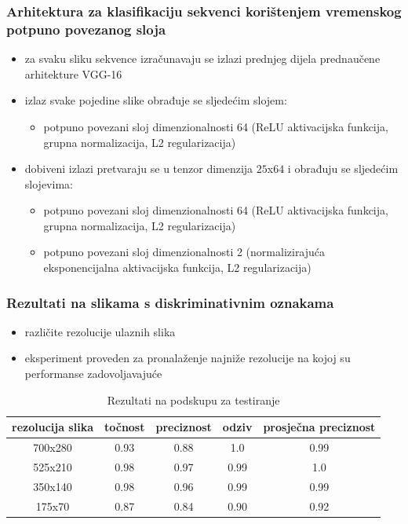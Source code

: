 \documentclass{beamer}
\begin{document}
\begin{frame}
\frametitle{Arhitektura za klasifikaciju sekvenci korištenjem vremenskog potpuno povezanog sloja}
 \begin{itemize}
  \item za svaku sliku sekvence izračunavaju se izlazi prednjeg dijela prednaučene arhitekture VGG-16
  \item izlaz svake pojedine slike obrađuje se sljedećim slojem:
  \begin{itemize}
   \item potpuno povezani sloj dimenzionalnosti 64 (ReLU aktivacijska funkcija, grupna normalizacija, L2 regularizacija)
  \end{itemize}
  \item dobiveni izlazi pretvaraju se u tenzor dimenzija $25$x$64$ i obrađuju se sljedećim slojevima:
  \begin{itemize}
  \item potpuno povezani sloj dimenzionalnosti 64 (ReLU aktivacijska funkcija, grupna normalizacija, L2 regularizacija)
  \item potpuno povezani sloj dimenzionalnosti 2 (normalizirajuća eksponencijalna aktivacijska funkcija, L2 regularizacija)
 \end{itemize}
 \end{itemize}

\end{frame}

\begin{frame}
 \frametitle{Rezultati na slikama s diskriminativnim oznakama}
 \begin{itemize}
  \item različite rezolucije ulaznih slika
  \item eksperiment proveden za pronalaženje najniže rezolucije na kojoj su performanse zadovoljavajuće
 \end{itemize}
 
 \begin{table}[H]
\centering
\caption{Rezultati na podskupu za testiranje}
\label{score:single_hand_test_resolutions}
\begin{tabular}{|c|c|c|c|c|}
\hline
rezolucija slika & točnost & preciznost & odziv & prosječna preciznost \\ \hline
700x280          &     0.93    &   0.88         &   1.0    &       0.99               \\ \hline
525x210          &    0.98     &    0.97        &   0.99    &       1.0               \\ \hline
350x140          &     0.98    &    0.96        &   0.99    &        0.99              \\ \hline
175x70           &    0.87     &    0.84        &   0.90    &      0.92                \\ \hline
\end{tabular}
\end{table}

\end{frame}
\end{document}
